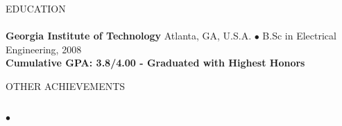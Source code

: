 \documentclass[12pt]{article}
\newcommand{\lineunder}{\vspace*{-9pt} \\ \hspace*{-18pt} \hrulefill \\}
\newcommand{\header}[1]{{\hspace*{-15pt}\vspace*{6pt} \textsc{#1}} \vspace*{-9pt} \lineunder}
\newenvironment{achievements}{\begin{list}{$\bullet$}{\topsep 0pt \itemsep -2pt}}{\vspace*{4pt}\end{list}}
\newcommand{\schoolwithcourses}[4]{
 \textbf{#1} #2 $\bullet$ #3\\
#4 \\
\vspace*{5pt}
}
\begin{document}
\header{EDUCATION}
  \schoolwithcourses{Georgia Institute of Technology}{Atlanta, GA, U.S.A.}{B.Sc in Electrical Engineering, 2008}
    {\textbf{Cumulative GPA: 3.8/4.00  - Graduated with Highest Honors}}

\header{OTHER ACHIEVEMENTS}
  \begin{achievements}
    \item
    \item
    \item
    \item
    \item
  \end{achievements}
\end{document}
